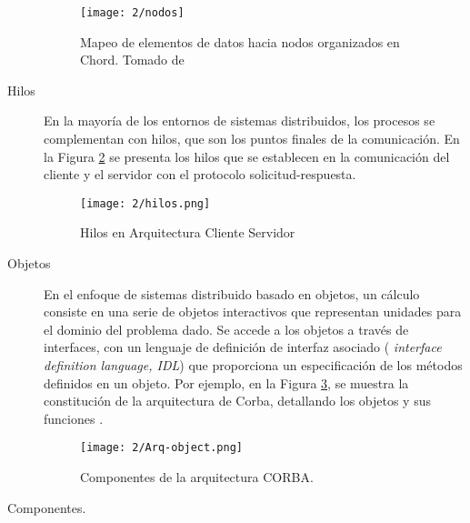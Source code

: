 \begin{description}
\begin{tcolorbox}
 		\end{tcolorbox}
 		
	
	\begin{figure}%
			\begin{center}
		\texttt{[image: 2/nodos]}
		\caption{Mapeo de elementos de datos hacia nodos organizados en Chord. Tomado de \cite{Tanenbaum2007} }
		\label{fig:Arq-nodos}
			\end{center}
	  \end{figure} 
		
	\item [Hilos] En la mayoría de los entornos de sistemas distribuidos, los procesos se complementan con \gls{hilos}, que  son los puntos finales de la comunicación. 
	En la Figura {\ref{fig:Arq-hilos}} se presenta   los hilos  que se establecen en la  comunicaci\'on del cliente y el servidor con el \gls{protocolo solicitud-respuesta}.
	
	\begin{figure}%
			\begin{center}
		\texttt{[image: 2/hilos.png]}
		\caption{Hilos en Arquitectura Cliente Servidor}
		\label{fig:Arq-hilos}
			\end{center}
	   \end{figure} 
	
	\item[Objetos]   En el enfoque de sistemas distribuido basado en \gls{objetos}, un cálculo consiste en una serie de objetos interactivos que representan unidades  para el dominio del problema dado. Se accede a los objetos a través de interfaces, con un lenguaje de definición de interfaz asociado ( \textit{interface definition language, IDL}) que proporciona un especificación de los métodos definidos en un objeto. 
	 
	Por ejemplo, en la Figura \ref{fig:Arq-object}, se muestra la constituci\'on de la arquitectura de \gls{Corba}, detallando los objetos y sus funciones \cite{Corba2022}. 

	\begin{figure}  
		\begin{center}%
		\texttt{[image: 2/Arq-object.png]}
		\caption{Componentes de la arquitectura CORBA.}
		\label{fig:Arq-object}
	 \end{center}
  \end{figure} 
	
	\item [Componentes.]  
	

\end{description}
